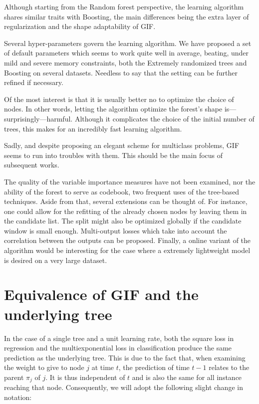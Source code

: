 \documentclass{article}
\begin{document}
Although starting from the Random forest perspective, the learning algorithm 
shares similar traits with Boosting, the main differences being the extra layer 
of regularization and the shape adaptability of GIF.

Several hyper-parameters govern the learning algorithm. We have proposed a set 
of default parameters which seems to work quite well in average, beating, under 
mild and severe memory constraints, both the Extremely randomized trees and 
Boosting on several datasets. Needless to say that the setting can be further 
refined if necessary.

Of the most interest is that it is usually better no to optimize the choice of 
nodes. In other words, letting the algorithm optimize the forest's shape 
is---surprisingly---harmful. Although it complicates the choice of the 
initial number of trees, this makes for an incredibly fast learning algorithm.

Sadly, and despite proposing an elegant scheme for multiclass problems, GIF 
seems to run into troubles with them. This should be the main focus of 
subsequent works.

The quality of the variable importance measures have not been examined, nor the 
ability of the forest to serve as codebook, two frequent uses of the tree-based 
techniques. Aside from that, several extensions can be thought of. For 
instance, one could allow for the refitting of the already chosen nodes by 
leaving them in the candidate list. The split might also be optimized globally 
if the candidate window is small enough. Multi-output losses which take into 
account the correlation between the outputs can be proposed. Finally, a online 
variant of the algorithm would be interesting for the case where a extremely 
lightweight model is desired on a very large dataset.













\appendix
\section{Equivalence of GIF and the underlying tree}\label{app:Equiv}
In the case of a single tree and a unit learning rate, both the square loss in 
regression and the multiexponential loss in classification produce the same 
prediction as the underlying tree. 
This is due to the fact that, when examining the weight to give to node $j$ at 
time $t$, the prediction of time $t-1$ relates to the parent $\pi_j$ of $j$. It 
is thus independent of $t$ and is also the same for all instance reaching that 
node. Consequently, we will adopt the following slight change in notation:
\end{document}
